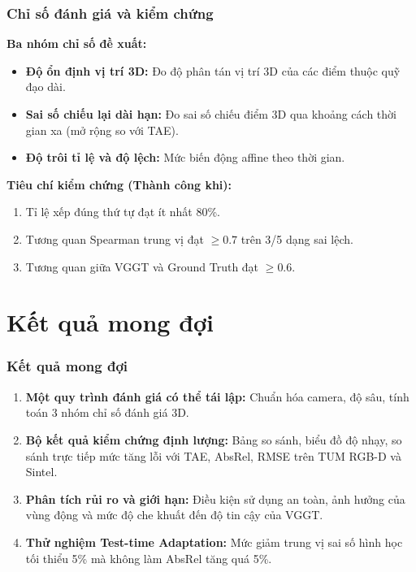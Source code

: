 \documentclass[
	11pt, 
]{beamer}
\begin{document}
\begin{frame}
	\frametitle{Chỉ số đánh giá và kiểm chứng}
	
	\textbf{Ba nhóm chỉ số đề xuất:}
	\begin{itemize}
		\item \textbf{Độ ổn định vị trí 3D:} Đo độ phân tán vị trí 3D của các điểm thuộc quỹ đạo dài.
		\item \textbf{Sai số chiếu lại dài hạn:} Đo sai số chiếu điểm 3D qua khoảng cách thời gian xa (mở rộng so với TAE).
		\item \textbf{Độ trôi tỉ lệ và độ lệch:} Mức biến động affine theo thời gian.
	\end{itemize}
	
	\vspace{0.3cm}
	\textbf{Tiêu chí kiểm chứng (Thành công khi):}
	\begin{enumerate}
		\item Tỉ lệ xếp đúng thứ tự đạt ít nhất 80\%.
		\item Tương quan Spearman trung vị đạt $\ge 0.7$ trên 3/5 dạng sai lệch.
		\item Tương quan giữa VGGT và Ground Truth đạt $\ge 0.6$.
	\end{enumerate}
\end{frame}


\section{Kết quả mong đợi}

\begin{frame}
	\frametitle{Kết quả mong đợi}
	
	\begin{enumerate}
		\item \textbf{Một quy trình đánh giá có thể tái lập:} Chuẩn hóa camera, độ sâu, tính toán 3 nhóm chỉ số đánh giá 3D.
		\vspace{0.2cm}
		\item \textbf{Bộ kết quả kiểm chứng định lượng:} Bảng so sánh, biểu đồ độ nhạy, so sánh trực tiếp mức tăng lỗi với TAE, AbsRel, RMSE trên TUM RGB-D và Sintel.
		\vspace{0.2cm}
		\item \textbf{Phân tích rủi ro và giới hạn:} Điều kiện sử dụng an toàn, ảnh hưởng của vùng động và mức độ che khuất đến độ tin cậy của VGGT.
		\vspace{0.2cm}
		\item \textbf{Thử nghiệm Test-time Adaptation:} Mức giảm trung vị sai số hình học tối thiểu 5\% mà không làm AbsRel tăng quá 5\%.
	\end{enumerate}
\end{frame}
\end{document}
